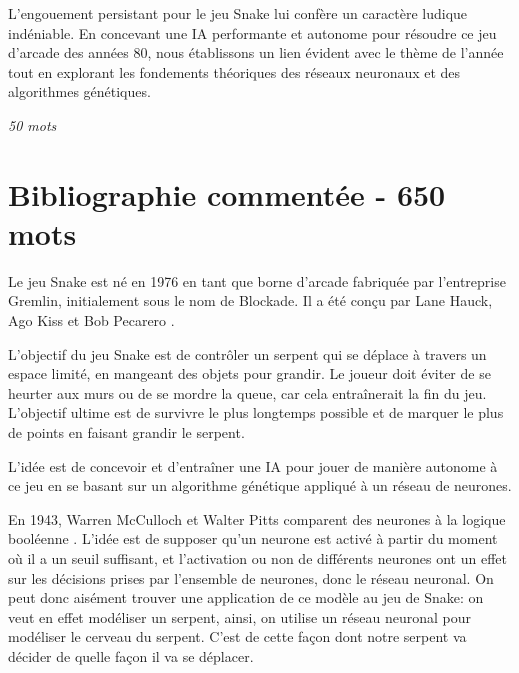 \documentclass[11pt,a4paper]{article}
\begin{document}
L'engouement persistant pour le jeu Snake lui confère un caractère ludique 
indéniable. En concevant une IA performante et autonome pour résoudre ce jeu 
d'arcade des années 80, nous établissons un lien évident avec le thème de 
l'année tout en explorant les fondements théoriques des réseaux neuronaux et 
des algorithmes génétiques.

\textit{50 mots}

\section{Bibliographie commentée - 650 mots}


Le jeu Snake est né en 1976 en tant que borne d'arcade fabriquée par l'entreprise Gremlin,
 initialement sous le nom de Blockade. Il a été conçu par Lane Hauck, Ago Kiss et Bob Pecarero \cite{GoldenAgeArcadeHistorian2015}.


L'objectif du jeu Snake est de contrôler un serpent qui se déplace à travers un espace limité, 
en mangeant des objets pour grandir. Le joueur doit éviter de se heurter aux murs ou de se mordre 
la queue, car cela entraînerait la fin du jeu. L'objectif ultime est de survivre le plus longtemps 
possible et de marquer le plus de points en faisant grandir le serpent.

L'idée est de concevoir et d'entraîner une IA pour jouer de manière autonome à ce jeu en se 
basant sur un algorithme génétique appliqué à un réseau de neurones.





En 1943, Warren McCulloch et Walter Pitts comparent des neurones à la logique booléenne \cite{reseauNeuronesIBM}.
L'idée est de supposer qu'un neurone est activé à partir du moment où il a un seuil suffisant,
et l'activation ou non de différents neurones ont un effet sur les décisions prises par l'ensemble
de neurones, donc le réseau neuronal.
On peut donc aisément trouver une application de ce modèle au jeu de Snake: on veut en effet 
modéliser un serpent, ainsi, on utilise un réseau neuronal pour modéliser le cerveau du serpent.
C'est de cette façon dont notre serpent va décider de quelle façon il va se déplacer. 
\end{document}
